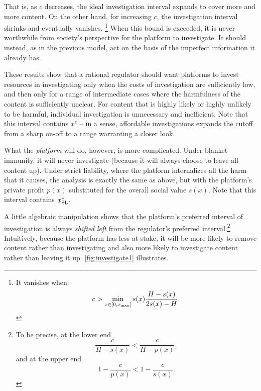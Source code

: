 That is, as $c$ decreases, the ideal investigation interval expands to cover more and more content. On the other hand, for increasing $c$, the investigation interval shrinks and eventually vanishes. \footnote{It vanishes when:
\begin{equation*}
c > \min_{x \in [0, x_{\text{max}}]} s(x)\frac{H - s(x)}{2s(x) - H}.
\end{equation*}}
When this bound is exceeded, it is never worthwhile from society's perspective for the platform to investigate. It should instead, as in the previous model, act on the basis of the imperfect information it already has.

These results show that a rational regulator should want platforms to invest resources in investigating only when the costs of investigation are sufficiently low, and then only for a range of intermediate cases where the harmfulness of the content is sufficiently unclear. For content that is highly likely or highly unlikely to be harmful, individual investigation is unnecessary and inefficient. Note that this interval contains $x^e$ -- in a sense, affordable investigations expands the cutoff from a sharp on-off to a range warranting a closer look.

What the \emph{platform} will do, however, is more complicated. Under blanket immunity, it will never investigate (because it will always choose to leave all content up). Under strict liability, where the platform internalizes all the harm that it causes, the analysis is exactly the same as above, but with the platform's private profit $p(x)$ substituted for the overall social value $s(x)$. Note that this interval contains $x_{\text{SL}}^*$.

A little algebraic manipulation shows that the platform's preferred interval of investigation is always \emph{shifted left} from the regulator's preferred interval.\footnote{To be precise, at the lower end \begin{equation*}\frac{c}{H - s(x)} < \frac{c}{H - p(x)},\end{equation*} and at the upper end \begin{equation*}1 - \frac{c}{p(x)} < 1 - \frac{c}{s(x)}.\end{equation*}} Intuitively, because the platform has less at stake, it will be more likely to remove content rather than investigating and also more likely to investigate content rather than leaving it up. \autoref{fig:investigate1} illustrates. 



